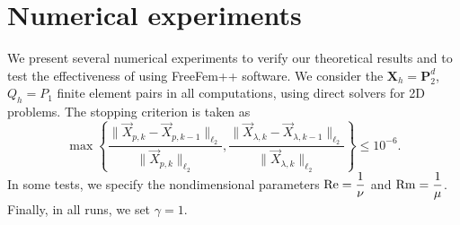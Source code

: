\documentclass[3p]{elsarticle}
\def\V#1{\mathbf{#1}}
\def\VX{\mathbf{X}}
\begin{document}
\section{Numerical experiments}\label{sec:Numerics}
We present several numerical experiments to verify our theoretical results and to test the effectiveness of using FreeFem++ \cite{Hec2012} software. 
We consider the $\VX_h=\V{P}_2^d$,\, $Q_h=P_1$ finite element pairs in all computations, using direct solvers for 2D problems. 
The stopping criterion is taken as 
%
$$\max\left \lbrace \dfrac{\|\overrightarrow{X}_{p,k}-\overrightarrow{X}_{p,k-1}\|_{\ell_2}}{\| \overrightarrow{X}_{p,k} \|_{\ell_2}}, \dfrac{\| \overrightarrow{X}_{\lambda,k}-\overrightarrow{X}_{\lambda,k-1}\|_{\ell_2}}{\| \overrightarrow{X}_{\lambda,k} \|_{\ell_2}} \right \rbrace \leq 10^{-6}.$$ 
%
In some tests, we specify the nondimensional parameters ${\rm Re} = \dfrac{1}{\nu}$ and ${\rm Rm} = \dfrac{1}{\mu}$. Finally, in all runs, we set $\gamma=1$.
\end{document}
